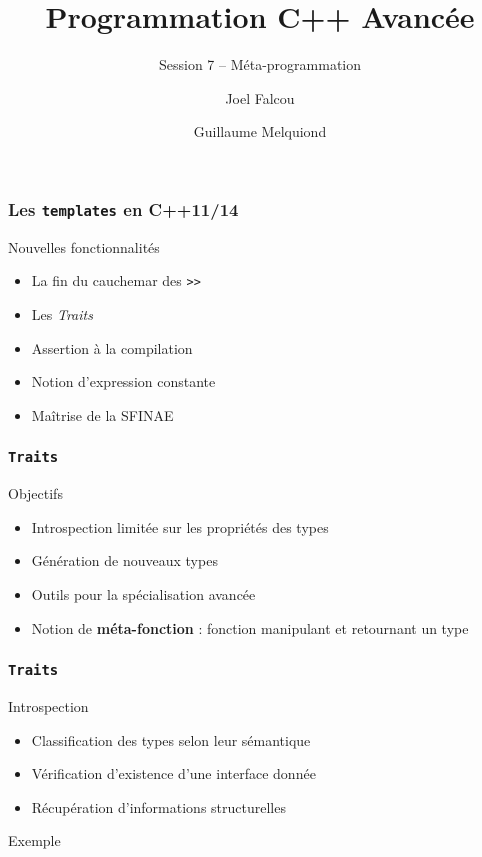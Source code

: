 \documentclass[svgnames]{beamer}
\title{Programmation C++ Avancée}
\subtitle{Session 7 -- Méta-programmation}
\author{Joel Falcou \and Guillaume Melquiond}
\institute{Laboratoire de Recherche en Informatique}
\date{}
\begin{document}



\begin{frame}[plain]
\titlepage
\end{frame}
\setcounter{framenumber}{0}

\frame
{
  \frametitle{Les \texttt{templates} en C++11/14}

  \begin{block}{Nouvelles fonctionnalités}
  \begin{itemize}
  \item La fin du cauchemar des \texttt{>>}
  \item Les \textit{Traits}
  \item Assertion \`a la compilation
  \item Notion d'expression constante
  \item Maîtrise de la SFINAE
  \end{itemize}
  \end{block}
}

\frame
{
  \frametitle{\texttt{Traits}}

  \begin{block}{Objectifs}
  \begin{itemize}
  \item Introspection limitée sur les propriétés des types
  \item Génération de nouveaux types
  \item Outils pour la spécialisation avancée
  \item Notion de \textbf{méta-fonction} : fonction manipulant et retournant un type
  \end{itemize}
  \end{block}
}

\frame
{
  \frametitle{\texttt{Traits}}

  \begin{block}{Introspection}
  \begin{itemize}
  \item Classification des types selon leur sémantique
  \item Vérification d'existence d'une interface donnée
  \item Récupération d'informations structurelles
  \end{itemize}
  \end{block}

  \begin{block}{Exemple}
  \medskip
  \end{block}
}
\end{document}
